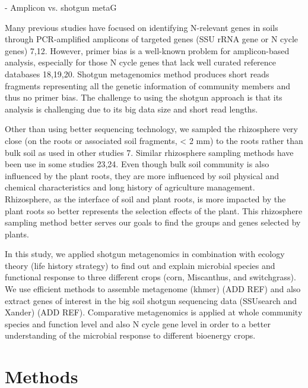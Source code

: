 \documentclass[12pt]{article}
\begin{document}
- Amplicon vs. shotgun metaG

Many previous studies have focused on identifying N-relevant genes in soils through PCR-amplified amplicons of targeted genes (SSU rRNA gene or N cycle genes) 7,12. However, primer bias is a well-known problem for amplicon-based analysis, especially for those N cycle genes that lack well curated reference databases 18,19,20. Shotgun metagenomics method produces short reads fragments representing all the genetic information of community members and thus no primer bias. The challenge to using the shotgun approach is that its analysis is challenging due to its big data size and short read lengths.

Other than using better sequencing technology, we sampled the rhizosphere very close (on the roots or associated soil fragments, {\textless} 2 mm) to the roots rather than bulk soil as used in other studies 7. Similar rhizosphere sampling methods have been use in some studies 23,24. Even though bulk soil community is also influenced by the plant roots, they are more influenced by soil physical and chemical characteristics and long history of agriculture management. Rhizosphere, as the interface of soil and plant roots, is more impacted by the plant roots so better represents the selection effects of the plant. This rhizosphere sampling method better serves our goals to find the groups and genes selected by plants.

In this study, we applied shotgun metagenomics in combination with ecology theory (life history strategy) to find out and explain microbial species and functional response to three different crops (corn, Miscanthus, and switchgrass). We use efficient methods to assemble metagenome (khmer) (ADD REF) and also extract genes of interest in the big soil shotgun sequencing data (SSUsearch and Xander) (ADD REF). Comparative metagenomics is applied at whole community species and function level and also N cycle gene level in order to a better understanding of the microbial response to different bioenergy crops. 

\section{Methods}
\end{document}
